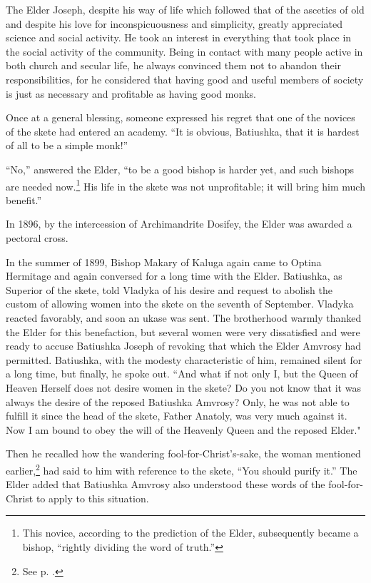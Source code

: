 The Elder Joseph, despite his way of life which followed that of the ascetics of old and despite his love for inconspicuousness and simplicity, greatly appreciated science and social activity. He took an interest in everything that took place in the social activity of the community. Being in contact with many people active in both church and secular life, he always convinced them not to abandon their responsibilities, for he considered that having good and useful members of society is just as necessary and profitable as having good monks.

Once at a general blessing, someone expressed his regret that one of the novices of the skete had entered an academy. “It is obvious, Batiushka, that it is hardest of all to be a simple monk!”

“No,” answered the Elder, “to be a good bishop is harder yet, and such bishops are needed now.\footnote{This novice, according to the prediction of the Elder, subsequently became a bishop, “rightly dividing the word of truth.”} His life in the skete was not unprofitable; it will bring him much benefit.”

In 1896, by the intercession of Archimandrite Dosifey, the Elder was awarded a pectoral cross.

In the summer of 1899, Bishop Makary of Kaluga again came to Optina Hermitage and again conversed for a long time with the Elder. Batiushka, as Superior of the skete, told Vladyka of his desire and request to abolish the custom of allowing women into the skete on the seventh of September. Vladyka reacted favorably, and soon an ukase was sent. The brotherhood warmly thanked the Elder for this benefaction, but several women were very dissatisfied and were ready to accuse Batiushka Joseph of revoking that which the Elder Amvrosy had permitted. Batiushka, with the modesty characteristic of him, remained silent for a long time, but finally, he spoke out. “And what if not only I, but the Queen of Heaven Herself does not desire women in the skete? Do you not know that it was always the desire of the reposed Batiushka Amvrosy? Only, he was not able to fulfill it since the head of the skete, Father Anatoly, was very much against it. Now I am bound to obey the will of the Heavenly Queen and the reposed Elder."

Then he recalled how the wandering fool-for-Christ’s-sake, the woman mentioned earlier,\footnote{See p. \pageref{lady-before}.} had said to him with reference to the skete, “You should purify it.” The Elder added that Batiushka Amvrosy also understood these words of the fool-for-Christ to apply to this situation.

